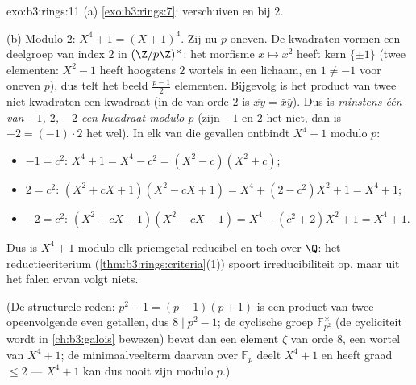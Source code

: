 \begin{solution}{exo:b3:rings:11}
(a) \cref{exo:b3:rings:7}: verschuiven en  bij $2$.

(b) Modulo $2$: $X^4 + 1 = (X + 1)^4$. Zij nu $p$ oneven. De
kwadraten vormen een deelgroep van index $2$ in $(\Z/p\Z)^\times$:
het morfisme $x \mapsto x^2$ heeft kern $\{\pm 1\}$ (twee
elementen: $X^2 - 1$ heeft hoogstens $2$ wortels in een lichaam, en
$1 \neq -1$ voor oneven $p$), dus telt het beeld $\frac{p-1}2$
elementen. Bijgevolg is het product van twee niet-kwadraten een
kwadraat (in de  van orde $2$ is $\overline{xy} = \bar
x\bar y$). Dus is \emph{minstens één van $-1$, $2$, $-2$ een
kwadraat modulo $p$} (zijn $-1$ en $2$ het niet, dan is $-2 =
(-1)\cdot 2$ het wel). In elk van die gevallen ontbindt $X^4 + 1$
modulo $p$:
\begin{itemize}
  \item $-1 = c^2$: \quad $X^4 + 1 = X^4 - c^2 = (X^2 - c)(X^2 +
        c)$;
  \item $2 = c^2$: \quad $(X^2 + cX + 1)(X^2 - cX + 1) = X^4 + (2
        - c^2)X^2 + 1 = X^4 + 1$;
  \item $-2 = c^2$: \quad $(X^2 + cX - 1)(X^2 - cX - 1) = X^4 -
        (c^2 + 2)X^2 + 1 = X^4 + 1$.
\end{itemize}
Dus is $X^4+1$ modulo elk priemgetal reducibel en toch 
over $\Q$: het reductiecriterium
(\cref{thm:b3:rings:criteria}(1)) spoort irreducibiliteit op, maar
uit het falen ervan volgt niets.

(De structurele reden: $p^2 - 1 = (p-1)(p+1)$ is een product van
twee opeenvolgende even getallen, dus $8 \mid p^2 - 1$; de
cyclische groep $\mathbb F_{p^2}^\times$ (de cycliciteit wordt in
\cref{ch:b3:galois} bewezen) bevat dan een element $\zeta$ van orde
$8$, een wortel van $X^4 + 1$; de minimaalveelterm daarvan over
$\mathbb F_p$ deelt $X^4+1$ en heeft graad $\leq 2$ --- $X^4+1$ kan
dus nooit  zijn modulo $p$.)
\end{solution}

